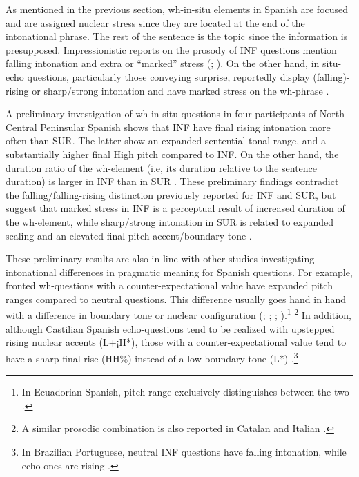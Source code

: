\documentclass[output=paper,colorlinks,citecolor=brown,draftmode]{langscibook}
\begin{document}
As mentioned in the previous section, wh-in-situ elements in Spanish are focused and are assigned nuclear stress since they are located at the end of the intonational phrase. The rest of the sentence is the topic since the information is presupposed. Impressionistic reports on the prosody of INF questions mention falling intonation and extra or ``marked'' stress (\citealp[63]{escandellvidal1999}; \citealp[]{Uribe-Etxebarria2002,RegleroTicio2013}). On the other hand, in situ-echo questions, particularly those conveying surprise, reportedly display (falling)-rising or sharp/strong intonation and have marked stress on the wh-phrase \citep{contreras1999, Pope1976, escandellvidal1999, Sobin2010, Chernova2013, Chernova2017}.

A preliminary investigation of wh-in-situ questions in four participants of North-Central Peninsular Spanish shows that INF have final rising intonation more often than SUR. The latter show an expanded sentential tonal range, and a substantially higher final High pitch compared to INF. On the other hand, the duration ratio of the wh-element (i.e, its duration relative to the sentence duration) is larger in INF than in SUR \citep{gonzalez2018dime}. These preliminary findings contradict the falling/falling-rising distinction previously reported for INF and SUR, but suggest that marked stress in INF is a perceptual result of increased duration of the wh-element, while sharp/strong intonation in SUR is related to expanded scaling and an elevated final pitch accent/boundary tone \citep[for stress correlates in Spanish, see][]{ortega2007, Ortega-LlebariaPrieto2011,Hualde2014}.

These preliminary results are also in line with other studies investigating intonational differences in pragmatic meaning for Spanish questions. For example, fronted wh-questions with a counter-expectational value have expanded pitch ranges compared to neutral questions. This difference usually goes hand in hand with a difference in boundary tone \citep[Argentinian Spanish:][]{gabriel2010} or nuclear configuration (\citealp[Peninsular Spanish:][]{Estebas-VilaplanaPrieto}; \citealp[][374]{hualde2015}; \citealp[Mexican Spanish:][]{delamota2010}; \citealp[Venezuelan Spanish:][]{astruc2010}).\footnote{In Ecuadorian Spanish, pitch range exclusively distinguishes between the two \citep{HuttenlauchFeldhausen2016}.} \footnote{A similar prosodic combination is also reported in Catalan and Italian \citep{gili2015intonational, prieto2015}.}  In addition, although Castilian Spanish echo-questions tend to be realized with upstepped rising nuclear accents (L+¡H*), those with a counter-expectational value tend to have a sharp final rise (HH\%) instead of a low boundary tone (L*) \citep[][]{Estebas-VilaplanaPrieto}.\footnote{In Brazilian Portuguese, neutral INF questions have falling intonation, while echo ones are rising \citep{kato2019}.}
\end{document}
